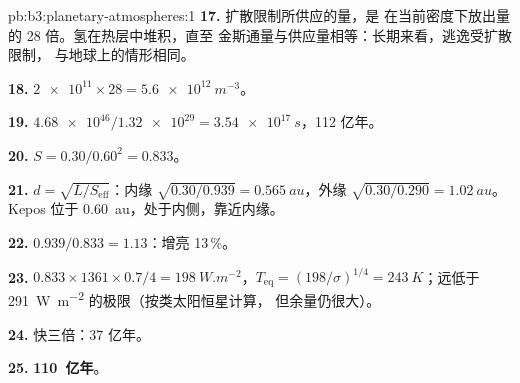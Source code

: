 \begin{solution}{pb:b3:planetary-atmospheres:1}
\textbf{17.} 扩散限制所供应的量，是
在当前密度下放出量的 28 倍。氢在热层中堆积，直至
金斯通量与供应量相等：长期来看，逃逸受扩散限制，
与地球上的情形相同。

\textbf{18.} $\num{2e11}\times28 = \qty{5.6e12}{m^{-3}}$。

\textbf{19.} $\num{4.68e46}/\num{1.32e29} = \qty{3.54e17}{s}$，112 亿年。

\textbf{20.} $S = 0.30/0.60^2 = 0.833$。

\textbf{21.} $d = \sqrt{L/S_\mathrm{eff}}$：内缘 $\sqrt{0.30/0.939} =
\qty{0.565}{au}$，外缘 $\sqrt{0.30/0.290} = \qty{1.02}{au}$。
Kepos 位于 \qty{0.60}{au}，处于内侧，靠近内缘。

\textbf{22.} $0.939/0.833 = 1.13$：增亮 13\,\%。

\textbf{23.} $0.833\times1361\times0.7/4 = \qty{198}{W.m^{-2}}$，$T_\mathrm{eq} =
(198/\sigma)^{1/4} = \qty{243}{K}$；远低于
\qty{291}{W.m^{-2}} 的极限（按类太阳恒星计算，
但余量仍很大）。

\textbf{24.} 快三倍：37 亿年。

\textbf{25.} \textbf{110~亿年}。
\end{solution}
